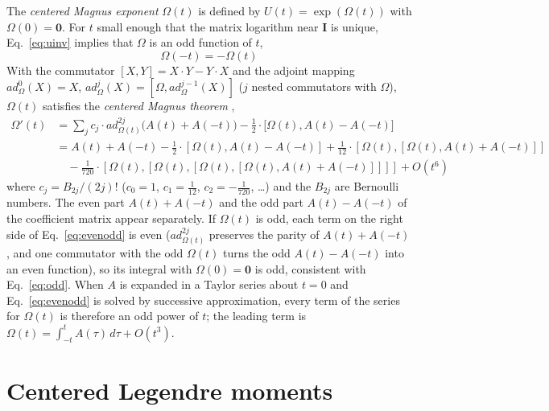 \documentclass[12pt]{article}
\begin{document}
The \emph{centered Magnus exponent} $\Omega(t)$ is defined by $U(t)=\exp(\Omega(t))$ with $\Omega(0)=\mathbf{0}$. For $t$ small enough that the matrix logarithm near $\mathbf{I}$ is unique, Eq.~\ref{eq:uinv} implies that $\Omega$ is an odd function of $t$,
\begin{equation}
\Omega(-t)=-\Omega(t)\label{eq:odd}
\end{equation}
With the commutator $[X,Y]=X\cdot Y-Y\cdot X$ and the adjoint mapping $ad_{\Omega}^{0}(X)=X$, $ad_{\Omega}^{j}(X)=[\Omega,ad_{\Omega}^{j-1}(X)]$ ($j$ nested commutators with $\Omega$), $\Omega(t)$ satisfies the \emph{centered Magnus theorem} \cite{jtut},
\begin{equation}
\begin{aligned}
\Omega'(t)&=\sum_{j}c_{j}\cdot ad_{\Omega(t)}^{2j}\big(A(t)+A(-t)\big)-\tfrac{1}{2}\cdot\big[\Omega(t),A(t)-A(-t)\big]\\
&=A(t)+A(-t)-\tfrac{1}{2}\cdot[\Omega(t),A(t)-A(-t)]+\tfrac{1}{12}\cdot[\Omega(t),[\Omega(t),A(t)+A(-t)]]\\
&\quad-\tfrac{1}{720}\cdot[\Omega(t),[\Omega(t),[\Omega(t),[\Omega(t),A(t)+A(-t)]]]]+O(t^{6})
\end{aligned}\label{eq:evenodd}
\end{equation}
where $c_j=B_{2j}/(2j)!$ ($c_0=1$, $c_1=\frac{1}{12}$, $c_2=-\frac{1}{720}$, …) and the $B_{2j}$ are Bernoulli numbers. The even part $A(t)+A(-t)$ and the odd part $A(t)-A(-t)$ of the coefficient matrix appear separately. If $\Omega(t)$ is odd, each term on the right side of Eq.~\ref{eq:evenodd} is even ($ad_{\Omega(t)}^{2j}$ preserves the parity of $A(t)+A(-t)$, and one commutator with the odd $\Omega(t)$ turns the odd $A(t)-A(-t)$ into an even function), so its integral with $\Omega(0)=\mathbf{0}$ is odd, consistent with Eq.~\ref{eq:odd}. When $A$ is expanded in a Taylor series about $t=0$ and Eq.~\ref{eq:evenodd} is solved by successive approximation, every term of the series for $\Omega(t)$ is therefore an odd power of $t$; the leading term is $\Omega(t)=\int_{-t}^{t}A(\tau)\,d\tau+O(t^3)$.

\section*{Centered Legendre moments}
\end{document}
